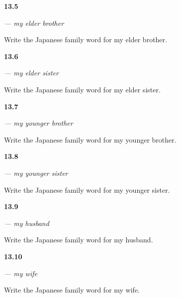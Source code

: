 \noindent\begin{minipage}[t]{\linewidth}
\raggedright
\hypertarget{review-JA-C13-ani-recall}{\textbf{13.5}} \emph{ — my elder brother}\par
\small Write the Japanese family word for my elder brother.
\end{minipage}\par\medskip

\noindent\begin{minipage}[t]{\linewidth}
\raggedright
\hypertarget{review-JA-C13-ane-recall}{\textbf{13.6}} \emph{ — my elder sister}\par
\small Write the Japanese family word for my elder sister.
\end{minipage}\par\medskip

\noindent\begin{minipage}[t]{\linewidth}
\raggedright
\hypertarget{review-JA-C13-otouto-recall}{\textbf{13.7}} \emph{ — my younger brother}\par
\small Write the Japanese family word for my younger brother.
\end{minipage}\par\medskip

\noindent\begin{minipage}[t]{\linewidth}
\raggedright
\hypertarget{review-JA-C13-imouto-recall}{\textbf{13.8}} \emph{ — my younger sister}\par
\small Write the Japanese family word for my younger sister.
\end{minipage}\par\medskip

\noindent\begin{minipage}[t]{\linewidth}
\raggedright
\hypertarget{review-JA-C13-otto-recall}{\textbf{13.9}} \emph{ — my husband}\par
\small Write the Japanese family word for my husband.
\end{minipage}\par\medskip

\noindent\begin{minipage}[t]{\linewidth}
\raggedright
\hypertarget{review-JA-C13-tsuma-recall}{\textbf{13.10}} \emph{ — my wife}\par
\small Write the Japanese family word for my wife.
\end{minipage}\par\medskip

